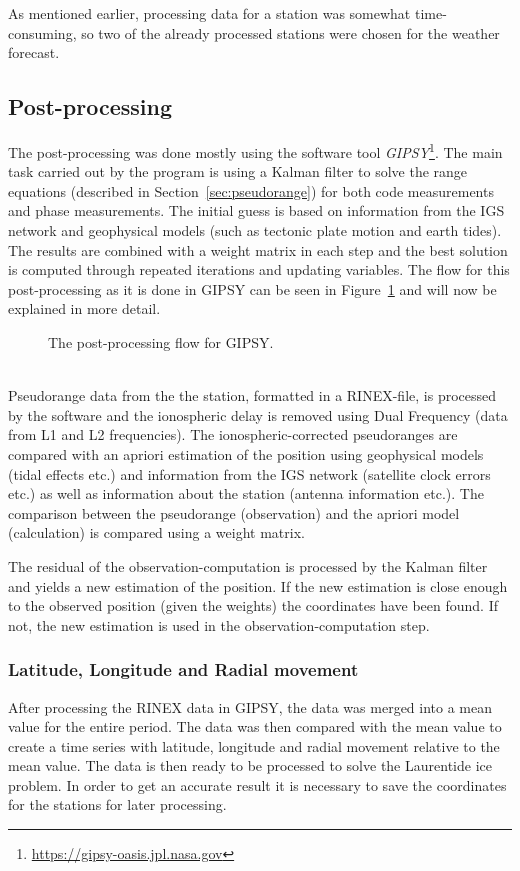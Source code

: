 \documentclass[12pt,a4paper]{article}
\begin{document}
As mentioned earlier, processing data for a station was somewhat time-consuming, so two of the already processed stations were chosen for the weather forecast.

\subsection{Post-processing}
The post-processing was done mostly using the software tool \textit{GIPSY}\footnote{\url{https://gipsy-oasis.jpl.nasa.gov}}.
The main task carried out by the program is using a Kalman filter to solve the range equations (described in Section~\ref{sec:pseudorange}) for both code measurements and phase measurements.
The initial guess is based on information from the IGS network and geophysical models (such as tectonic plate motion and earth tides).
The results are combined with a weight matrix in each step and the best solution is computed through repeated iterations and updating variables.
The flow for this post-processing as it is done in GIPSY can be seen in Figure~\ref{fig:gipsy_flow} and will now be explained in more detail.
\begin{figure}[!ht]
  \centering
  \noindent{}
  \caption{The post-processing flow for GIPSY.}
  \label{fig:gipsy_flow}
\end{figure}\\

\noindent Pseudorange data from the the station, formatted in a RINEX-file, is processed by the software and the ionospheric delay is removed using Dual Frequency (data from L1 and L2 frequencies).
The ionospheric-corrected pseudoranges are compared with an apriori estimation of the position using geophysical models (tidal effects etc.) and information from the IGS network (satellite clock errors etc.) as well as information about the station (antenna information etc.).
The comparison between the pseudorange (observation) and the apriori model (calculation) is compared using a weight matrix.

The residual of the observation-computation is processed by the Kalman filter and yields a new estimation of the position.
If the new estimation is close enough to the observed position (given the weights) the coordinates have been found.
If not, the new estimation is used in the observation-computation step.

\subsubsection{Latitude, Longitude and Radial movement}
After processing the RINEX data in GIPSY, the data was merged into a mean value for the entire period.
The data was then compared with the mean value to create a time series with latitude, longitude and radial movement relative to the mean value.
The data is then ready to be processed to solve the Laurentide ice problem.
In order to get an accurate result it is necessary to save the coordinates for the stations for later processing.
\end{document}
